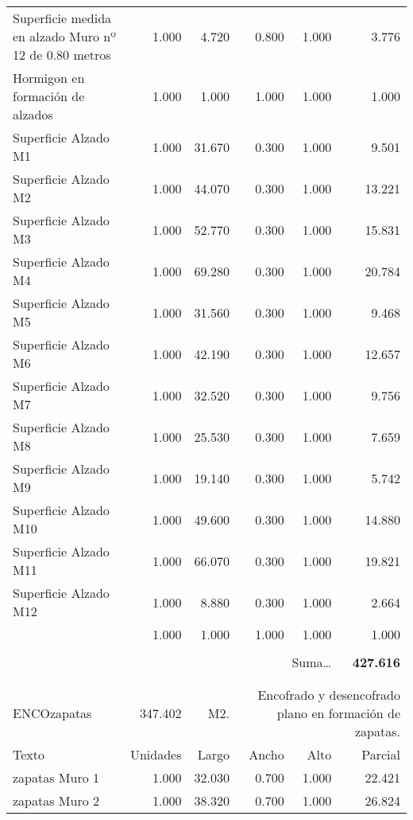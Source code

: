\documentclass{book}%
\begin{document}
\begin{longtable}{lrrrrr}
\multicolumn{1}{p{3.5cm}}{Superficie medida en alzado Muro nº 12 de 0.80 metros }&1.000&4.720&0.800&1.000&3.776\\%
\multicolumn{1}{p{3.5cm}}{Hormigon en formación de alzados}&1.000&1.000&1.000&1.000&1.000\\%
\multicolumn{1}{p{3.5cm}}{Superficie Alzado M1}&1.000&31.670&0.300&1.000&9.501\\%
\multicolumn{1}{p{3.5cm}}{Superficie Alzado M2}&1.000&44.070&0.300&1.000&13.221\\%
\multicolumn{1}{p{3.5cm}}{Superficie Alzado M3}&1.000&52.770&0.300&1.000&15.831\\%
\multicolumn{1}{p{3.5cm}}{Superficie Alzado M4}&1.000&69.280&0.300&1.000&20.784\\%
\multicolumn{1}{p{3.5cm}}{Superficie Alzado M5}&1.000&31.560&0.300&1.000&9.468\\%
\multicolumn{1}{p{3.5cm}}{Superficie Alzado M6}&1.000&42.190&0.300&1.000&12.657\\%
\multicolumn{1}{p{3.5cm}}{Superficie Alzado M7}&1.000&32.520&0.300&1.000&9.756\\%
\multicolumn{1}{p{3.5cm}}{Superficie Alzado M8}&1.000&25.530&0.300&1.000&7.659\\%
\multicolumn{1}{p{3.5cm}}{Superficie Alzado M9}&1.000&19.140&0.300&1.000&5.742\\%
\multicolumn{1}{p{3.5cm}}{Superficie Alzado M10}&1.000&49.600&0.300&1.000&14.880\\%
\multicolumn{1}{p{3.5cm}}{Superficie Alzado M11}&1.000&66.070&0.300&1.000&19.821\\%
\multicolumn{1}{p{3.5cm}}{Superficie Alzado M12}&1.000&8.880&0.300&1.000&2.664\\%
\multicolumn{1}{p{3.5cm}}{}&1.000&1.000&1.000&1.000&1.000\\%
&&&&&\\%
\multicolumn{5}{r}{Suma\ldots}&\textbf{427.616}\\%
\hline%
&&&&&\\%
&&&&&\\%
ENCOzapatas&347.402& M2.&\multicolumn{3}{p{6cm}}{\scriptsize Encofrado y desencofrado plano en formación de zapatas.\normalsize}\\%
Texto&Unidades&Largo&Ancho&Alto&Parcial\\%
\hline%
\multicolumn{1}{p{3.5cm}}{ zapatas Muro 1}&1.000&32.030&0.700&1.000&22.421\\%
\multicolumn{1}{p{3.5cm}}{ zapatas Muro 2}&1.000&38.320&0.700&1.000&26.824\\%

\end{longtable}
\end{document}
